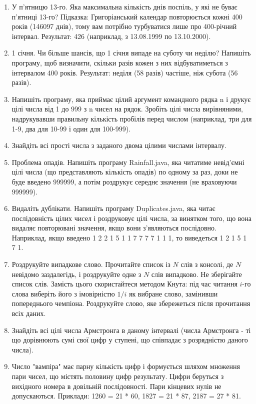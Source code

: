 \documentclass[]{article}
\begin{document}
\begin{enumerate}
\item У п’ятницю 13-го. Яка максимальна кількість днів поспіль, у які не буває п’ятниці 13-го?
Підказка: Григоріанський календар повторюється кожні 400 років (146097 днів), тому вам потрібно турбуватися лише про 400-річний інтервал.
Результат: 426 (наприклад, з 13.08.1999 по 13.10.2000).
\item
 1 січня. Чи більше шансів, що 1 січня випаде на суботу чи неділю?
Напишіть програму, щоб визначити, скільки разів кожен з них відбуватиметься з інтервалом 400 років.
Результат: неділя (58 разів) частіше, ніж субота (56 разів).
\item
 Напишіть програму, яка приймає цілий аргумент командного рядка n і друкує цілі числа від 1 до 999 з n чисел на рядок. Зробіть цілі числа вирівняними, надрукувавши правильну кількість пробілів перед числом (наприклад, три для 1-9, два для 10-99 і один для 100-999).

\item
 Знайдіть всі прості числа з заданого двома цілими числами інтервалу. 

\item Проблема опадів.
Напишіть програму Rainfall.java, яка читатиме невід’ємні цілі числа (що представляють кількість опадів)
по одному за раз, доки не буде введено 999999, а потім роздрукує середнє значення (не враховуючи 999999).

\item Видаліть дублікати.
Напишіть програму Duplicates.java, яка читає послідовність цілих чисел і роздруковує цілі числа,
за винятком того, що вона видаляє повторювані значення, якщо вони з’являються послідовно.
Наприклад, якщо введено 1 2 2 1 5 1 1 7 7 7 7 1 1 1, то виведеться 1 2 1 5 1 7 1.

\item Роздрукуйте випадкове слово. Прочитайте список із $N$ слів з консолі, де $N$ невідомо заздалегідь,
і роздрукуйте одне з $N$ слів випадково. Не зберігайте список слів.
Замість цього скористайтеся методом Кнута: під час читання $i$-го слова виберіть його з імовірністю $1/i$ як вибране слово,
замінивши попереднього чемпіона. Роздрукуйте слово, яке збережеться після прочитання всіх даних.

\item 
Знайдіть всі цілі числа Армстронга в даному інтервалі (числа Армстронга - ті що дорівнюють сумі свої цифр у ступені, що співпадає з розрядністю даного числа).

\item
Число "вампіра" має парну кількість цифр і формується шляхом множення пари чисел, що містять половину цифр результату. Цифри беруться з вихідного номера в довільній послідовності. Пари кінцевих нулів не допускаються. 
Приклади: 1260 = 21 * 60, 1827 = 21 * 87, 2187 = 27 * 81.


\end{enumerate}
\end{document}
